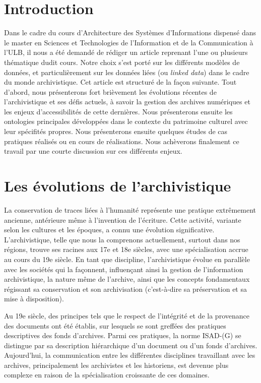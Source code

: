 \documentclass[12pt]{report}
\begin{document}
\section{Introduction}
Dans le cadre du cours d'Architecture des Systèmes d'Informations dispensé dans le master en Sciences et Technologies de l'Information et de la Communication à l'ULB, il nous a été demandé de rédiger un article reprenant l'une ou plusieurs thématique dudit cours. Notre choix s'est porté sur les différents modèles de données, et particulièrement sur les données liées (ou \textit{linked data}) dans le cadre du monde archivistique. Cet article est structuré de la façon suivante. Tout d'abord, nous présenterons fort brièvement les évolutions récentes de l'archivistique et ses défis actuels, à savoir la gestion des archives numériques et les enjeux d'accessibilités de cette dernières. Nous présenterons ensuite les ontologies principales développées dans le contexte du patrimoine culturel avec leur spécifités propres. Nous présenterons ensuite quelques études de cas pratiques réalisés ou en cours de réalisations. Nous achèverons finalement ce travail par une courte discussion sur ces différents enjeux. 
\section{Les évolutions de l'archivistique}
La conservation de traces liées à l'humanité représente une pratique extrêmement ancienne, antérieure même à l'invention de l'écriture. Cette activité, variante selon les cultures et les époques, a connu une évolution significative. L'archivistique, telle que nous la comprenons actuellement, surtout dans nos régions, trouve ses racines aux 17e et 18e siècles, avec une spécialisation accrue au cours du 19e siècle. En tant que discipline, l'archivistique évolue en parallèle avec les sociétés qui la façonnent, influençant ainsi la gestion de l'information archivistique, la nature même de l'archive, ainsi que les concepts fondamentaux régissant sa conservation et son archivisation (c'est-à-dire sa préservation et sa mise à disposition).

Au 19e siècle, des principes tels que le respect de l'intégrité et de la provenance des documents ont été établis, sur lesquels se sont greffées des pratiques descriptives des fonds d'archives. Parmi ces pratiques, la norme ISAD-(G) se distingue par sa description hiérarchique d'un document ou d'un fonds d'archives. Aujourd'hui, la communication entre les différentes disciplines travaillant avec les archives, principalement les archivistes et les historiens, est devenue plus complexe en raison de la spécialisation croissante de ces domaines.
\end{document}
